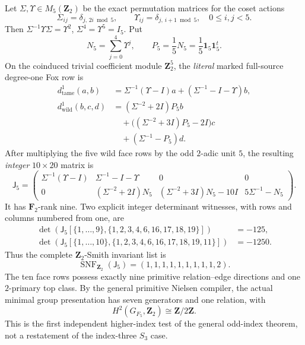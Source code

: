 \begin{theorem}
Let $\Sigma,\Upsilon\in
M_5(\mathbf Z_2)$
be the exact
permutation matrices
for the coset
actions
\[
\Sigma_{ij}
=\delta_{j,\,2i\bmod5},
\qquad
\Upsilon_{ij}
=\delta_{j,\,i+1\bmod5},
\quad
0\le i,j<5.
\]
Then
$\Sigma^{-1}\Upsilon\Sigma=\Upsilon^2$,
$\Sigma^4=\Upsilon^5=I_5$.
Put
\begin{equation}\label{eq:dyadic-f135-index-five-norm}
N_5=\sum_{j=0}^4\Upsilon^j,
\qquad
P_5=\frac15N_5
=\frac15\mathbf1_5\mathbf1_5^t .
\end{equation}
On the coinduced
trivial coefficient
module $\mathbf Z_2^5$,
the \emph{literal}
marked full-source
degree-one Fox row is
\begin{equation}\label{eq:dyadic-f135-index-five-fox-blocks}
\boxed{
\begin{aligned}
d^1_{\mathrm{tame}}(a,b)
&=\Sigma^{-1}(\Upsilon-I)a+
   (\Sigma^{-1}-I-\Upsilon)b,\\
d^1_{\mathrm{wild}}(b,c,d)
&=(\Sigma^{-2}+2I)P_5b\\
&\quad+
\bigl((\Sigma^{-2}+3I)P_5-2I\bigr)c\\
&\quad+
(\Sigma^{-1}-P_5)d .
\end{aligned}}
\end{equation}
After multiplying
the five wild
face rows by
the odd $2$-adic
unit $5$,
the resulting
\emph{integer}
$10\times20$
matrix is
\begin{equation}\label{eq:dyadic-f135-index-five-scaled-jacobian}
\boxed{
\mathsf J_5=
\begin{pmatrix}
\Sigma^{-1}(\Upsilon-I)&
\Sigma^{-1}-I-\Upsilon&
0&0\\
0&(\Sigma^{-2}+2I)N_5&
(\Sigma^{-2}+3I)N_5-10I&
5\Sigma^{-1}-N_5
\end{pmatrix}.
}
\end{equation}
It has
$\mathbf F_2$-rank nine.
Two explicit
integer determinant
witnesses, with
rows and columns
numbered from one,
are
\begin{equation}\label{eq:dyadic-f135-index-five-minors}
\boxed{
\begin{aligned}
\det(\mathsf J_5[
\{1,\dots,9\},
\{1,2,3,4,6,16,17,18,19\}])
&=-125,\\
\det(\mathsf J_5[
\{1,\dots,10\},
\{1,2,3,4,6,16,17,18,19,11\}])
&=-1250 .
\end{aligned}}
\end{equation}
Thus the complete
$\mathbf Z_2$-Smith
invariant list is
\begin{equation}\label{eq:dyadic-f135-index-five-smith}
\boxed{\qquad
\operatorname{SNF}_{\mathbf Z_2}
(\mathsf J_5)
=(1,1,1,1,1,1,1,1,1,2).
\qquad}
\end{equation}
The ten face
rows possess
exactly nine
primitive
relation--edge
directions and one
$2$-primary top
class.  By the
general primitive
Nielsen compiler,
the actual
minimal group
presentation has
seven generators
and one relation,
with
\[
H^2(G_{F_5},\mathbf Z_2)
\cong\mathbf Z/2\mathbf Z.
\]
This is the first
independent higher-index
test of the general
odd-index theorem,
not a restatement
of the index-three
$S_3$ case.
\end{theorem}

